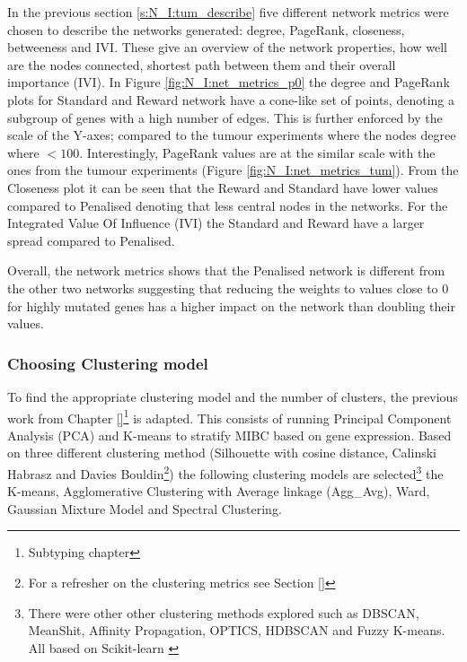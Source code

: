 In the previous section \ref{s:N_I:tum_describe} five different network metrics were chosen to describe the networks generated: degree, PageRank, closeness, betweeness and IVI. These give an overview of the network properties, how well are the nodes connected, shortest path between them and their overall importance (IVI). In Figure \ref{fig:N_I:net_metrics_p0} the degree and PageRank plots for Standard and Reward network have a cone-like set of points, denoting a subgroup of genes with a high number of edges. This is further enforced by the scale of the Y-axes; compared to the tumour experiments where the nodes degree where $<100$. Interestingly, PageRank values are at the similar scale with the ones from the tumour experiments (Figure \ref{fig:N_I:net_metrics_tum}). From the Closeness plot it can be seen that the Reward and Standard have lower values compared to Penalised denoting that less central nodes in the networks. For the Integrated Value Of Influence (IVI) the Standard and Reward have a larger spread compared to Penalised. 

Overall, the network metrics shows that the Penalised network is different from the other two networks suggesting that reducing the weights to values close to 0 for highly mutated genes has a higher impact on the network than doubling their values.

\subsubsection{Choosing Clustering model} \label{s:p0:clustering_analysis}

To find the appropriate clustering model and the number of clusters, the previous work from Chapter \ref{}\footnote{Subtyping chapter} is adapted. This consists of running Principal Component Analysis (PCA) and K-means to stratify MIBC based on gene expression. Based on three different clustering method (Silhouette with cosine distance, Calinski Habrasz and Davies Bouldin\footnote{For a refresher on the clustering metrics see Section \ref{}}) the following clustering models are selected\footnote{There were other other clustering methods explored such as DBSCAN, MeanShit, Affinity Propagation, OPTICS, HDBSCAN and Fuzzy K-means. All based on Scikit-learn \cite{Scikit-learn_undated-ax}} the K-means, Agglomerative Clustering with Average linkage (Agg\_Avg), Ward, Gaussian Mixture Model and Spectral Clustering. 

